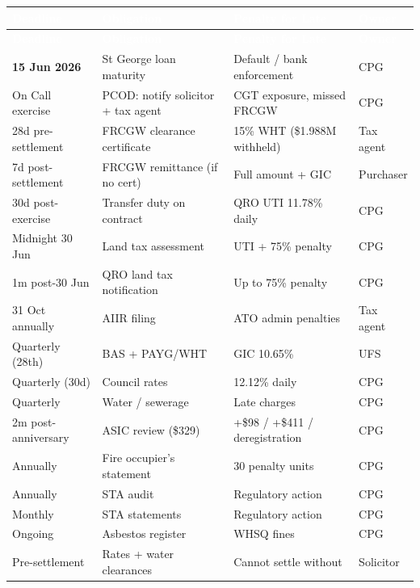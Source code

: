 \documentclass[10pt,a4paper]{article}
\begin{document}
{\small\sffamily
\begin{longtable}{@{} L{2.8cm} L{3.5cm} L{3.0cm} L{2.2cm} @{}}
\textcolor{white}{\bfseries Deadline} & \textcolor{white}{\bfseries Obligation} & \textcolor{white}{\bfseries Penalty for Late} & \textcolor{white}{\bfseries Owner} \\
\midrule
\endfirsthead
{}\textcolor{white}{\bfseries Deadline} & \textcolor{white}{\bfseries Obligation} & \textcolor{white}{\bfseries Penalty for Late} & \textcolor{white}{\bfseries Owner} \\
\midrule
\endhead
\textbf{15 Jun 2026} & St George loan maturity & Default / bank enforcement & CPG \\
On Call exercise & PCOD: notify solicitor + tax agent & CGT exposure, missed FRCGW & CPG \\
28d pre-settlement & FRCGW clearance certificate & 15\% WHT (\$1.988M withheld) & Tax agent \\
7d post-settlement & FRCGW remittance (if no cert) & Full amount + GIC & Purchaser \\
30d post-exercise & Transfer duty on contract & QRO UTI 11.78\% daily & CPG \\
Midnight 30 Jun & Land tax assessment & UTI + 75\% penalty & CPG \\
1m post-30 Jun & QRO land tax notification & Up to 75\% penalty & CPG \\
31 Oct annually & AIIR filing & ATO admin penalties & Tax agent \\
Quarterly (28th) & BAS + PAYG/WHT & GIC 10.65\% & UFS \\
Quarterly (30d) & Council rates & 12.12\% daily & CPG \\
Quarterly & Water / sewerage & Late charges & CPG \\
2m post-anniversary & ASIC review (\$329) & +\$98 / +\$411 / deregistration & CPG \\
Annually & Fire occupier's statement & 30 penalty units & CPG \\
Annually & STA audit & Regulatory action & CPG \\
Monthly & STA statements & Regulatory action & CPG \\
Ongoing & Asbestos register & WHSQ fines & CPG \\
Pre-settlement & Rates + water clearances & Cannot settle without & Solicitor \\

\end{longtable}}
\end{document}
